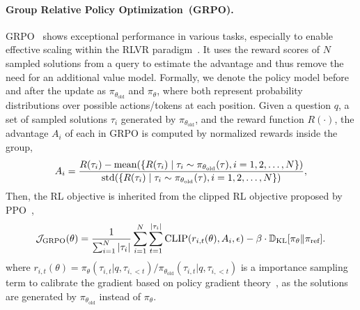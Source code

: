 \documentclass{article}
\begin{document}
\paragraph{Group Relative Policy Optimization~(GRPO).}
GRPO~\cite{grpo} shows exceptional performance in various tasks, especially to enable effective scaling within the RLVR paradigm~\cite{r1,simplerl-zoo,drgrpo}.
It uses the reward scores of $N$ sampled solutions from a query to estimate the advantage and thus remove the need for an additional value model. 
Formally, we denote the policy model before and after the update as $\pi_{\theta_{\text{old}}}$ and $\pi_{\theta}$, where both represent probability distributions over possible actions/tokens at each position.
Given a question $q$, a set of sampled solutions $\tau_i$ generated by $\pi_{\theta_{\text{old}}}$, and the reward function $R(\cdot)$, the advantage $A_i$ of each in GRPO is computed by normalized rewards inside the group, 
\begin{gather}
    A_i = \frac{R(\tau_i) - \text{mean}(\{R(\tau_i) \mid \tau_i \sim \pi_{\theta_{\text{old}}}(\tau), i = 1,2,\ldots,N\})}{\color{black}\text{std}(\{R(\tau_i) \mid \tau_i \sim \pi_{\theta_{\text{old}}}(\tau), i = 1,2,\ldots,N\})},
\end{gather}
Then, the RL objective is inherited from the clipped RL objective proposed by PPO~\cite{ppo}, 
\begin{equation}
\begin{gathered}
\mathcal{J}_{\text{GRPO}}(\theta) = \frac{1}{\sum_{i=1}^N {\color{black}|\tau_i|}} \sum_{i=1}^N \sum_{t=1}^{|\tau_i|} \text{CLIP}(r_{i,t}(\theta), A_i, \epsilon) - \beta \cdot \mathbb{D}_{\text{KL}}[\pi_\theta \| \pi_{\text{ref}}]. \\%
\end{gathered}
\label{eq:grpo}
\end{equation}
where ${r_{i,t}(\theta) = {\pi_\theta(\tau_{i,t} | q, \tau_{i,<t})}/{\pi_{\theta_{\text{old}}}(\tau_{i,t} | q, \tau_{i,<t})}}$ is a importance sampling term to calibrate the gradient based on policy gradient theory~\cite{policy_gradient}, as the solutions are generated by $\pi_{\theta_{\text{old}}}$ instead of $\pi_\theta$. 
\end{document}

